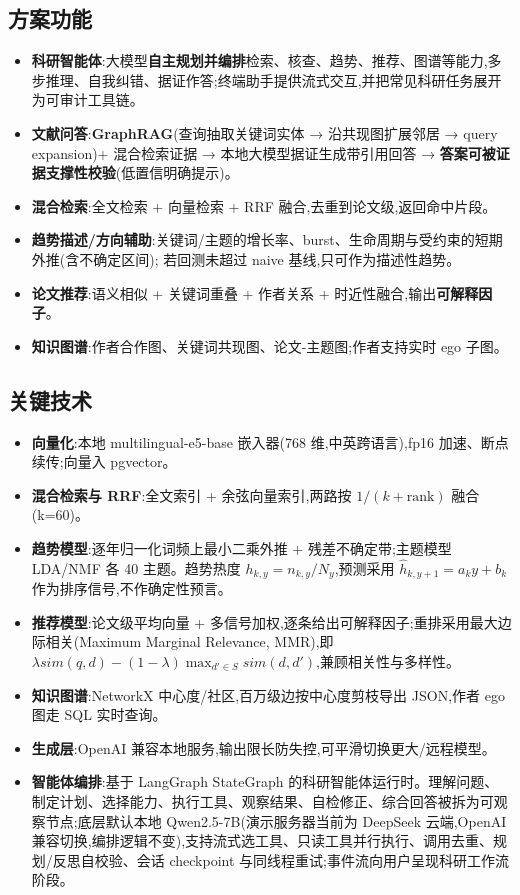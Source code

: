 \subsection{方案功能}
\begin{itemize}
\item \textbf{科研智能体}:大模型\textbf{自主规划并编排}检索、核查、趋势、推荐、图谱等能力,多步推理、自我纠错、据证作答;终端助手提供流式交互,并把常见科研任务展开为可审计工具链。
\item \textbf{文献问答}:\textbf{GraphRAG}(查询抽取关键词实体 → 沿共现图扩展邻居 → query expansion)+ 混合检索证据 → 本地大模型据证生成带引用回答 → \textbf{答案可被证据支撑性校验}(低置信明确提示)。
\item \textbf{混合检索}:全文检索 + 向量检索 + RRF 融合,去重到论文级,返回命中片段。
\item \textbf{趋势描述/方向辅助}:关键词/主题的增长率、burst、生命周期与受约束的短期外推(含不确定区间); 若回测未超过 naive 基线,只可作为描述性趋势。
\item \textbf{论文推荐}:语义相似 + 关键词重叠 + 作者关系 + 时近性融合,输出\textbf{可解释因子}。
\item \textbf{知识图谱}:作者合作图、关键词共现图、论文-主题图;作者支持实时 ego 子图。
\end{itemize}

\subsection{关键技术}
\begin{itemize}
\item \textbf{向量化}:本地 multilingual-e5-base 嵌入器(768 维,中英跨语言),fp16 加速、断点续传;向量入 pgvector。
\item \textbf{混合检索与 RRF}:全文索引 + 余弦向量索引,两路按 $1/(k+\text{rank})$ 融合(k=60)。
\item \textbf{趋势模型}:逐年归一化词频上最小二乘外推 + 残差不确定带;主题模型 LDA/NMF 各 40 主题。趋势热度 $h_{k,y}=n_{k,y}/N_y$,预测采用 $\hat{h}_{k,y+1}=a_k y+b_k$ 作为排序信号,不作确定性预言。
\item \textbf{推荐模型}:论文级平均向量 + 多信号加权,逐条给出可解释因子;重排采用最大边际相关(Maximum Marginal Relevance, MMR),即 $\lambda sim(q,d)-(1-\lambda)\max_{d'\in S}sim(d,d')$,兼顾相关性与多样性。
\item \textbf{知识图谱}:NetworkX 中心度/社区,百万级边按中心度剪枝导出 JSON,作者 ego 图走 SQL 实时查询。
\item \textbf{生成层}:OpenAI 兼容本地服务,输出限长防失控,可平滑切换更大/远程模型。
\item \textbf{智能体编排}:基于 LangGraph StateGraph 的科研智能体运行时。理解问题、制定计划、选择能力、执行工具、观察结果、自检修正、综合回答被拆为可观察节点;底层默认本地 Qwen2.5-7B(演示服务器当前为 DeepSeek 云端,OpenAI 兼容切换,编排逻辑不变),支持流式选工具、只读工具并行执行、调用去重、规划/反思自校验、会话 checkpoint 与同线程重试;事件流向用户呈现科研工作流阶段。
\end{itemize}

